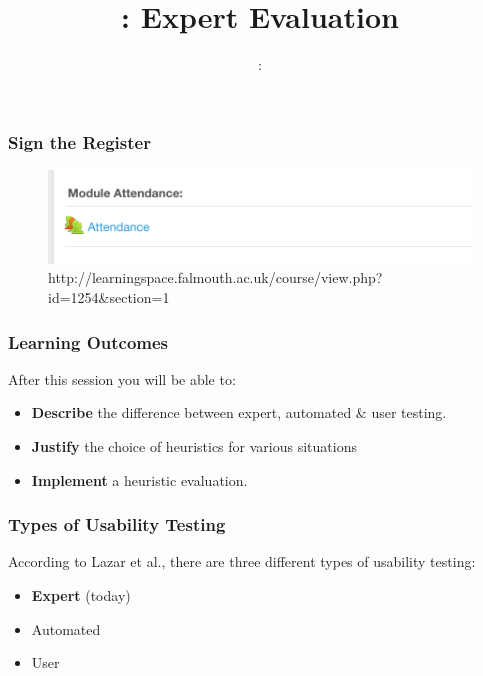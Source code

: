 \usepackage{../../beamerthemeFalmouthGamesAcademy}
\usepackage{multimedia}
\graphicspath{ {../../} }


\usepackage[normalem]{ulem}
\usepackage{wasysym}
\usepackage{gensymb}
\usepackage{pdfpages}
\usepackage{verbatim}


\usetikzlibrary{arrows,automata}




\title{\sessionnumber: Expert Evaluation}
\subtitle{\modulecode: \moduletitle}

\frame{\titlepage} 

\begin{frame}
	\frametitle{Sign the Register}
	\begin{figure}
		\includegraphics[scale=.5]{assets/attendance}
		\caption{\tiny{http://learningspace.falmouth.ac.uk/course/view.php?id=1254\&section=1 }}
	\end{figure}
\end{frame}

\begin{frame}
	\frametitle{Learning Outcomes}
	After this session you will be able to:

	\begin{itemize}
		\item \textbf{Describe} the difference between expert, automated \& user testing.
		\item \textbf{Justify} the choice of heuristics for various situations
		\item \textbf{Implement} a heuristic evaluation.
	\end{itemize}
\end{frame}

\begin{frame}
	\frametitle{Types of Usability Testing}
	
	According to Lazar et al., there are three different types of usability testing:

	\begin{itemize}
		\item \textbf{Expert} (today) 
		\item Automated 
		\item User
	\end{itemize}
\end{frame}

